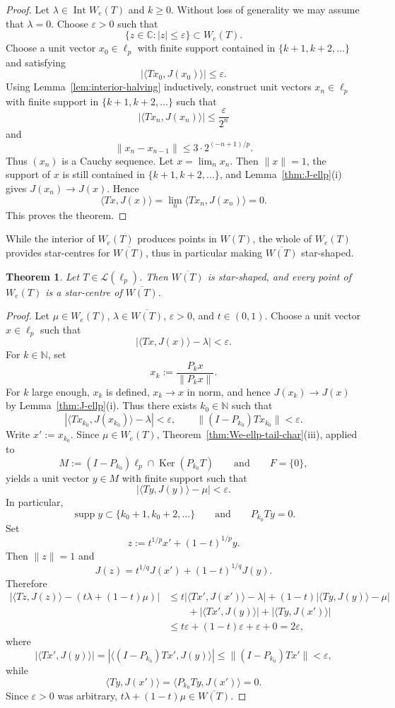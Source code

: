 \documentclass[11pt]{amsart}
\numberwithin{equation}{section}
\newtheorem{theorem}{Theorem}[section]
\theoremstyle{definition}
\theoremstyle{remark}
\DeclareMathOperator{\Ker}{Ker}
\DeclareMathOperator{\Int}{Int}
\DeclareMathOperator{\supp}{supp}
\newcommand{\C}{\mathbb{C}}
\newcommand{\N}{\mathbb{N}}
\newcommand{\ip}[2]{\langle #1,#2\rangle}
\newcommand{\We}{W_e}
\begin{document}
\begin{proof}
Let $\lambda\in \Int \We(T)$ and $k\ge 0$. Without loss of generality we may assume that $\lambda=0$.
Choose $\varepsilon>0$ such that
\[
\{z\in\C: |z|\le \varepsilon\}\subset \We(T).
\]
Choose a unit vector $x_0\in \ell_p$ with finite support contained in $\{k+1,k+2,\dots\}$ and satisfying
\[
|\ip{Tx_0}{J(x_0)}|\le \varepsilon.
\]
Using Lemma~\ref{lem:interior-halving} inductively, construct unit vectors $x_n\in \ell_p$ with finite support in $\{k+1,k+2,\dots\}$ such that
\[
|\ip{Tx_n}{J(x_n)}|\le \frac{\varepsilon}{2^n}
\]
and
\[
\|x_n-x_{n-1}\|\le 3\cdot 2^{(-n+1)/p}.
\]
Thus $(x_n)$ is a Cauchy sequence. Let $x=\lim_n x_n$. Then $\|x\|=1$, the support of $x$ is still contained in $\{k+1,k+2,\dots\}$, and Lemma~\ref{thm:J-ellp}(i) gives $J(x_n)\to J(x)$. Hence
\[
\ip{Tx}{J(x)}=\lim_n \ip{Tx_n}{J(x_n)}=0.
\]
This proves the theorem.
\end{proof}

While the interior of \(W_e(T)\) produces points in \(W(T)\), the whole of
\(W_e(T)\) provides star-centres for \(\overline{W(T)}\),  thus in particular making $\overline{W(T)}$ star-shaped.


\begin{theorem}\label{thm:closureW-starshaped}
Let $T\in \mathcal L(\ell_p)$. Then $\overline{W(T)}$ is star-shaped, and every point of $\We(T)$ is a star-centre of $\overline{W(T)}$.
\end{theorem}

\begin{proof}
Let $\mu\in \We(T)$, $\lambda\in \overline{W(T)}$, $\varepsilon>0$, and $t\in(0,1)$.
Choose a unit vector $x\in \ell_p$ such that
\[
|\ip{Tx}{J(x)}-\lambda|<\varepsilon.
\]
For $k\in\N$, set
\[
x_k:=\frac{P_kx}{\|P_kx\|}.
\]
For $k$ large enough, $x_k$ is defined, $x_k\to x$ in norm, and hence $J(x_k)\to J(x)$ by Lemma~\ref{thm:J-ellp}(i). Thus there exists $k_0\in\N$ such that
\[
|\ip{Tx_{k_0}}{J(x_{k_0})}-\lambda|<\varepsilon,
\qquad
\|(I-P_{k_0})Tx_{k_0}\|<\varepsilon.
\]
Write $x':=x_{k_0}$. Since $\mu\in \We(T)$, Theorem~\ref{thm:We-ellp-tail-char}\textup{(iii)}, applied to
\[
M:=(I-P_{k_0})\ell_p\cap \Ker(P_{k_0}T)
\qquad\text{and}\qquad F=\{0\},
\]
yields a unit vector $y\in M$ with finite support such that
\[
|\ip{Ty}{J(y)}-\mu|<\varepsilon.
\]
In particular,
\[
\supp y\subset \{k_0+1,k_0+2,\dots\}
\qquad\text{and}\qquad
P_{k_0}Ty=0.
\]
Set
\[
z:=t^{1/p}x'+(1-t)^{1/p}y.
\]
Then $\|z\|=1$ and
\[
J(z)=t^{1/q}J(x')+(1-t)^{1/q}J(y).
\]
Therefore
\begin{align*}
\bigl|\ip{Tz}{J(z)}-(t\lambda+(1-t)\mu)\bigr|
&\le t|\ip{Tx'}{J(x')}-\lambda|+(1-t)|\ip{Ty}{J(y)}-\mu|\\
&\qquad +|\ip{Tx'}{J(y)}|+|\ip{Ty}{J(x')}|\\
&\le t\varepsilon+(1-t)\varepsilon+\varepsilon+0=2\varepsilon,
\end{align*}
where
\[
|\ip{Tx'}{J(y)}|=|\ip{(I-P_{k_0})Tx'}{J(y)}|\le \|(I-P_{k_0})Tx'\|<\varepsilon,
\]
while
\[
\ip{Ty}{J(x')}=\ip{P_{k_0}Ty}{J(x')}=0.
\]
Since $\varepsilon>0$ was arbitrary, $t\lambda+(1-t)\mu\in \overline{W(T)}$.
\end{proof}
\end{document}
